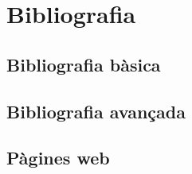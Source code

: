 \section{Bibliografia}
\subsection*{Bibliografia bàsica}
\subsection*{Bibliografia avançada}

\subsection*{Pàgines web}
